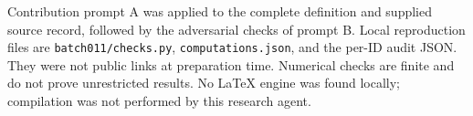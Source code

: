 \documentclass[11pt]{article}
\begin{document}
Contribution prompt A was applied to the complete definition and supplied source record, followed by the adversarial checks of prompt B. Local reproduction files are \texttt{batch011/checks.py}, \texttt{computations.json}, and the per-ID audit JSON. They were not public links at preparation time. Numerical checks are finite and do not prove unrestricted results. No LaTeX engine was found locally; compilation was not performed by this research agent.
\end{document}
